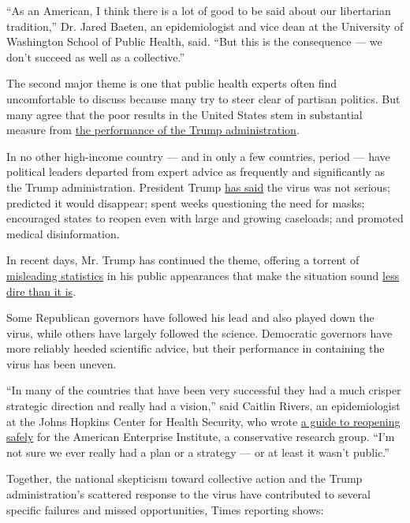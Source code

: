 ``As an American, I think there is a lot of good to be said about our
libertarian tradition,'' Dr. Jared Baeten, an epidemiologist and vice
dean at the University of Washington School of Public Health, said.
``But this is the consequence --- we don't succeed as well as a
collective.''

The second major theme is one that public health experts often find
uncomfortable to discuss because many try to steer clear of partisan
politics. But many agree that the poor results in the United States stem
in substantial measure from
\href{https://www.nytimes.com/2020/07/18/us/politics/trump-coronavirus-response-failure-leadership.html}{the
performance of the Trump administration}.

In no other high-income country --- and in only a few countries, period
--- have political leaders departed from expert advice as frequently and
significantly as the Trump administration. President Trump
\href{https://www.factcheck.org/2020/03/trumps-statements-about-the-coronavirus/}{has
said} the virus was not serious; predicted it would disappear; spent
weeks questioning the need for masks; encouraged states to reopen even
with large and growing caseloads; and promoted medical disinformation.

In recent days, Mr. Trump has continued the theme, offering a torrent of
\href{https://www.tampabay.com/news/health/2020/08/04/politifact-fact-checking-22-claims-from-donald-trumps-axios-interview/}{misleading
statistics} in his public appearances that make the situation sound
\href{https://www.nytimes.com/2020/08/04/us/politics/coronavirus-trump-data-briefing.html}{less
dire than it is}.

Some Republican governors have followed his lead and also played down
the virus, while others have largely followed the science. Democratic
governors have more reliably heeded scientific advice, but their
performance in containing the virus has been uneven.

``In many of the countries that have been very successful they had a
much crisper strategic direction and really had a vision,'' said Caitlin
Rivers, an epidemiologist at the Johns Hopkins Center for Health
Security, who wrote
\href{https://www.aei.org/research-products/report/national-coronavirus-response-a-road-map-to-reopening/}{a
guide to reopening safely} for the American Enterprise Institute, a
conservative research group. ``I'm not sure we ever really had a plan or
a strategy --- or at least it wasn't public.''

Together, the national skepticism toward collective action and the Trump
administration's scattered response to the virus have contributed to
several specific failures and missed opportunities, Times reporting
shows:

